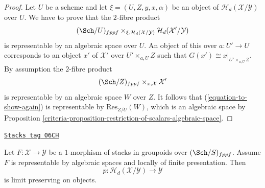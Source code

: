 \begin{proof}

Let $U$ be a scheme and let $\xi = (U, Z, y, x, \alpha)$ be an object of
$\mathcal{H}_d(\mathcal{X}/\mathcal{Y})$ over $U$.
We have to prove that the $2$-fibre product
\begin{equation}
\label{equation-to-show-again}
(\Sch/U)_{fppf}
\times_{\xi, \mathcal{H}_d(\mathcal{X}/\mathcal{Y})}
\mathcal{H}_d(\mathcal{X}'/\mathcal{Y})
\end{equation}
is representable by an algebraic space over $U$.
An object of this over $a : U' \to U$ corresponds to an object
$x'$ of $\mathcal{X}'$ over $U' \times_{a, U} Z$ such that
$G(x') \cong x|_{U' \times_{a, U} Z}$. By assumption the $2$-fibre product
$$
(\Sch/Z)_{fppf} \times_{x, \mathcal{X}} \mathcal{X}'
$$
is representable by an algebraic space $W$ over $Z$. It follows that
(\ref{equation-to-show-again}) is representable by $\text{Res}_{Z/U}(W)$,
which is an algebraic space by
Proposition \ref{criteria-proposition-restriction-of-scalars-algebraic-space}.
\end{proof}

\begin{lemma}
\label{criteria-lemma-limit-preserving}
\href{https://stacks.math.columbia.edu/tag/06CH}{\texttt{Stacks tag 06CH}}

Let $F : \mathcal{X} \to \mathcal{Y}$ be a $1$-morphism of stacks in groupoids
over $(\Sch/S)_{fppf}$. Assume $F$ is representable by algebraic
spaces and locally of finite presentation. Then
$$
p : \mathcal{H}_d(\mathcal{X}/\mathcal{Y}) \to \mathcal{Y}
$$
is limit preserving on objects.
\end{lemma}

